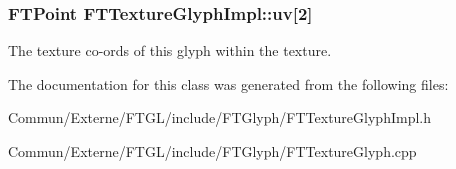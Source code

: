 \subsubsection[{\texorpdfstring{uv}{uv}}]{\setlength{\rightskip}{0pt plus 5cm}F\+T\+Point F\+T\+Texture\+Glyph\+Impl\+::uv\mbox{[}2\mbox{]}\hspace{0.3cm}{\ttfamily [private]}}\hypertarget{class_f_t_texture_glyph_impl_ad408b56e50fb32f4e0d83434271a1543}{}\label{class_f_t_texture_glyph_impl_ad408b56e50fb32f4e0d83434271a1543}
The texture co-\/ords of this glyph within the texture. 

The documentation for this class was generated from the following files\+:\begin{DoxyCompactItemize}
\item 
Commun/\+Externe/\+F\+T\+G\+L/include/\+F\+T\+Glyph/F\+T\+Texture\+Glyph\+Impl.\+h\item 
Commun/\+Externe/\+F\+T\+G\+L/include/\+F\+T\+Glyph/F\+T\+Texture\+Glyph.\+cpp\end{DoxyCompactItemize}
